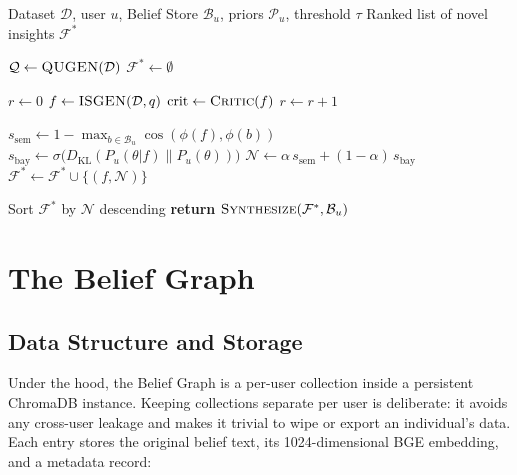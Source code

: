 \documentclass[conference]{IEEEtran}
\begin{document}
\begin{algorithm}
\caption{Agentic SND Pipeline}
\label{alg:snd}
\begin{algorithmic}[1]
\REQUIRE Dataset $\mathcal{D}$, user $u$, Belief Store $\mathcal{B}_u$,
         priors $\mathcal{P}_u$, threshold $\tau$
\ENSURE  Ranked list of novel insights $\mathcal{F}^*$

\STATE $\mathcal{Q} \leftarrow \textsc{QUGEN}(\mathcal{D})$
\STATE $\mathcal{F}^* \leftarrow \emptyset$

  \STATE $r \leftarrow 0$
  \REPEAT
    \STATE $f \leftarrow \textsc{ISGEN}(\mathcal{D}, q)$
    \STATE $\text{crit} \leftarrow \textsc{Critic}(f)$
    \STATE $r \leftarrow r + 1$

    \STATE $s_{\text{sem}} \leftarrow 1 - \max_{b \in \mathcal{B}_u} \cos(\phi(f), \phi(b))$
    \STATE $s_{\text{bay}} \leftarrow \sigma\!\bigl(D_{\mathrm{KL}}(P_u(\theta|f) \| P_u(\theta))\bigr)$
    \STATE $\mathcal{N} \leftarrow \alpha\, s_{\text{sem}} + (1-\alpha)\, s_{\text{bay}}$
      \STATE $\mathcal{F}^* \leftarrow \mathcal{F}^* \cup \{(f, \mathcal{N})\}$
    \ENDIF
  \ENDIF
\ENDFOR

\STATE Sort $\mathcal{F}^*$ by $\mathcal{N}$ descending
\STATE \textbf{return} $\textsc{Synthesize}(\mathcal{F}^*, \mathcal{B}_u)$
\end{algorithmic}
\end{algorithm}

\section{The Belief Graph}
\label{sec:beliefgraph}

\subsection{Data Structure and Storage}

Under the hood, the Belief Graph is a per-user collection inside a
persistent ChromaDB instance. Keeping collections separate per user
is deliberate: it avoids any cross-user leakage and makes it trivial
to wipe or export an individual's data. Each entry stores the
original belief text, its 1024-dimensional BGE embedding, and a
metadata record:
\end{document}
